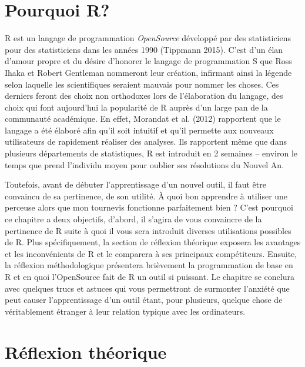 \documentclass[
  letterpaper,
]{scrbook}
\begin{document}
\hypertarget{pourquoi-r}{%
\section{Pourquoi R?}\label{pourquoi-r}}

R est un langage de programmation \emph{OpenSource} développé par des
statisticiens pour des statisticiens dans les années 1990 (Tippmann
2015). C'est d'un élan d'amour propre et du désire d'honorer le langage
de programmation S que Ross Ihaka et Robert Gentleman nommeront leur
création, infirmant ainsi la légende selon laquelle les scientifiques
seraient mauvais pour nommer les choses. Ces derniers feront des choix
non orthodoxes lors de l'élaboration du langage, des choix qui font
aujourd'hui la popularité de R auprès d'un large pan de la communauté
académique. En effet, Morandat et al. (2012) rapportent que le langage a
été élaboré afin qu'il soit intuitif et qu'il permette aux nouveaux
utilisateurs de rapidement réaliser des analyses. Ils rapportent même
que dans plusieurs départements de statistiques, R est introduit en 2
semaines -- environ le temps que prend l'individu moyen pour oublier ses
résolutions du Nouvel An.

Toutefois, avant de débuter l'apprentissage d'un nouvel outil, il faut
être convaincu de sa pertinence, de son utilité. À quoi bon apprendre à
utiliser une perceuse alors que mon tournevis fonctionne parfaitement
bien ? C'est pourquoi ce chapitre a deux objectifs, d'abord, il s'agira
de vous convaincre de la pertinence de R suite à quoi il vous sera
introduit diverses utilisations possibles de R. Plus spécifiquement, la
section de réflexion théorique exposera les avantages et les
inconvénients de R et le comparera à ses principaux compétiteurs.
Ensuite, la réflexion méthodologique présentera brièvement la
programmation de base en R et en quoi l'OpenSource fait de R un outil si
puissant. Le chapitre se conclura avec quelques trucs et astuces qui
vous permettront de surmonter l'anxiété que peut causer l'apprentissage
d'un outil étant, pour plusieurs, quelque chose de véritablement
étranger à leur relation typique avec les ordinateurs.

\hypertarget{ruxe9flexion-thuxe9orique}{%
\section{Réflexion théorique}\label{ruxe9flexion-thuxe9orique}}
\end{document}
